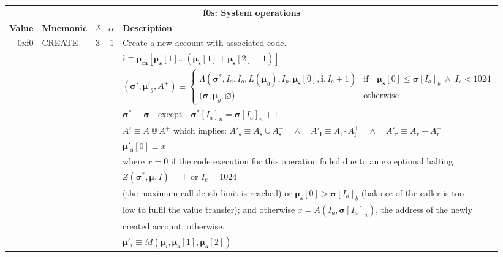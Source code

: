 \documentclass[9pt,oneside]{amsart}
\begin{document}
\begin{tabular*}{\columnwidth}[h]{rlrrl}
\toprule
\multicolumn{5}{c}{\textbf{f0s: System operations}} \vspace{5pt} \\
\textbf{Value} & \textbf{Mnemonic} & $\delta$ & $\alpha$ & \textbf{Description} \vspace{5pt} \\
0xf0 & {\small CREATE} & 3 & 1 & Create a new account with associated code. \\
&&&& $\mathbf{i} \equiv \boldsymbol{\mu}_\mathbf{m}[ \boldsymbol{\mu}_\mathbf{s}[1] \dots (\boldsymbol{\mu}_\mathbf{s}[1] + \boldsymbol{\mu}_\mathbf{s}[2] - 1) ]$ \\
&&&& $(\boldsymbol{\sigma}', \boldsymbol{\mu}'_g, A^+) \equiv \begin{cases}\Lambda(\boldsymbol{\sigma}^*, I_a, I_o, L(\boldsymbol{\mu}_g), I_p, \boldsymbol{\mu}_\mathbf{s}[0], \mathbf{i}, I_e + 1) & \text{if} \quad \boldsymbol{\mu}_\mathbf{s}[0] \leqslant \boldsymbol{\sigma}[I_a]_b \;\wedge\; I_e < 1024\\ \big(\boldsymbol{\sigma}, \boldsymbol{\mu}_g, \varnothing\big) & \text{otherwise} \end{cases}$ \\
&&&& $\boldsymbol{\sigma}^* \equiv \boldsymbol{\sigma} \quad \text{except} \quad \boldsymbol{\sigma}^*[I_a]_n = \boldsymbol{\sigma}[I_a]_n + 1$ \\
&&&& $A' \equiv A \Cup A^+$ which implies: $A'_\mathbf{s} \equiv A_\mathbf{s} \cup A^+_\mathbf{s} \quad \wedge \quad A'_\mathbf{l} \equiv A_\mathbf{l} \cdot A^+_\mathbf{l} \quad \wedge \quad A'_\mathbf{r} \equiv A_\mathbf{r} + A^+_\mathbf{r}$ \\
&&&& $\boldsymbol{\mu}'_\mathbf{s}[0] \equiv x$ \\
&&&& where $x=0$ if the code execution for this operation failed due to an exceptional halting \\
&&&& $Z(\boldsymbol{\sigma}^*, \boldsymbol{\mu}, I) = \top$ or $I_e = 1024$ \\
&&&& (the maximum call depth limit is reached) or $\boldsymbol{\mu}_\mathbf{s}[0] > \boldsymbol{\sigma}[I_a]_b$ (balance of the caller is too \\
&&&& low to fulfil the value transfer); and otherwise $x=A(I_a, \boldsymbol{\sigma}[I_a]_n)$, the address of the newly \\
&&&& created account, otherwise. \\
&&&& $\boldsymbol{\mu}'_i \equiv M(\boldsymbol{\mu}_i, \boldsymbol{\mu}_\mathbf{s}[1], \boldsymbol{\mu}_\mathbf{s}[2])$ \\

\end{tabular*}
\end{document}
